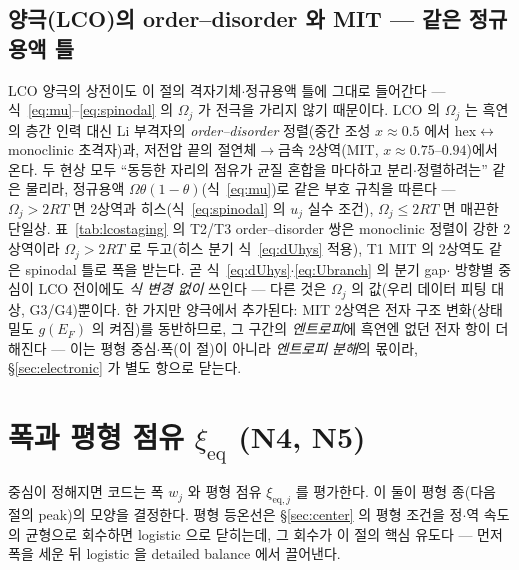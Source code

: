 \documentclass[11pt,a4paper]{article}
\newcommand{\eq}{\mathrm{eq}}
\begin{document}
\subsection{양극(LCO)의 order--disorder 와 MIT — 같은 정규용액 틀}\label{sec:hys-lco}
LCO 양극의 상전이도 이 절의 격자기체$\cdot$정규용액 틀에 그대로 들어간다 — 식~\eqref{eq:mu}--\eqref{eq:spinodal} 의
$\Omega_j$ 가 전극을 가리지 않기 때문이다. LCO 의 $\Omega_j$ 는 흑연의 층간 인력 대신 Li 부격자의 \emph{order--disorder}
정렬(중간 조성 $x\approx0.5$ 에서 hex$\leftrightarrow$monoclinic 초격자)과, 저전압 끝의 절연체$\to$금속 2상역(MIT,
$x\approx0.75$--$0.94$)에서 온다. 두 현상 모두 ``동등한 자리의 점유가 균질 혼합을 마다하고 분리$\cdot$정렬하려는''
같은 물리라, 정규용액 $\Omega\theta(1-\theta)$(식~\eqref{eq:mu})로 같은 부호 규칙을 따른다 — $\Omega_j>2RT$ 면 2상역과
히스(식~\eqref{eq:spinodal} 의 $u_j$ 실수 조건), $\Omega_j\le2RT$ 면 매끈한 단일상. 표~\ref{tab:lcostaging} 의 T2/T3
order--disorder 쌍은 monoclinic 정렬이 강한 2상역이라 $\Omega_j>2RT$ 로 두고(히스 분기 식~\eqref{eq:dUhys} 적용),
T1 MIT 의 2상역도 같은 spinodal 틀로 폭을 받는다. 곧 식~\eqref{eq:dUhys}$\cdot$\eqref{eq:Ubranch} 의 분기 gap$\cdot$
방향별 중심이 LCO 전이에도 \emph{식 변경 없이} 쓰인다 — 다른 것은 $\Omega_j$ 의 값(우리 데이터 피팅 대상, G3/G4)뿐이다.
한 가지만 양극에서 추가된다: MIT 2상역은 전자 구조 변화(상태밀도 $g(E_F)$ 의 켜짐)를 동반하므로, 그 구간의
\emph{엔트로피}에 흑연엔 없던 전자 항이 더해진다 — 이는 평형 중심$\cdot$폭(이 절)이 아니라 \emph{엔트로피 분해}의
몫이라, \S\ref{sec:electronic} 가 별도 항으로 닫는다.

\section{폭과 평형 점유 $\xi_\eq$ (N4, N5)}\label{sec:width}
중심이 정해지면 코드는 폭 $w_j$ 와 평형 점유 $\xi_{\eq,j}$ 를 평가한다. 이 둘이 평형 종(다음 절의 peak)의 모양을
결정한다. 평형 등온선은 \S\ref{sec:center} 의 평형 조건을 정$\cdot$역 속도의 균형으로 회수하면 logistic 으로 닫히는데,
그 회수가 이 절의 핵심 유도다 — 먼저 폭을 세운 뒤 logistic 을 detailed balance 에서 끌어낸다.
\end{document}
